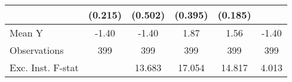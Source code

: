 {\begin{tabular}{l*{5}{c}}
            &     (0.215)         &     (0.502)         &     (0.395)         &     (0.185)         &                     \\
\midrule
Mean Y      &       -1.40         &       -1.40         &        1.87         &        1.56         &       -1.40         \\
Observations&         399         &         399         &         399         &         399         &         399         \\
Exc. Inst. F-stat&                     &      13.683         &      17.054         &      14.817         &       4.013         \\
\bottomrule
\end{tabular}
}

